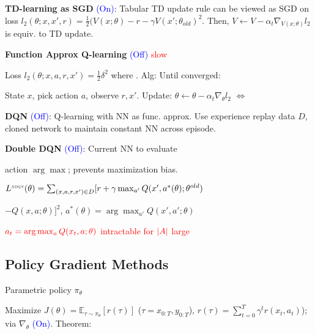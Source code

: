 \vspace*{1mm}
\textbf{TD-learning as SGD} {\fontsize{9}{6}\selectfont \textcolor{blue}{(On)}}: Tabular TD update rule can be viewed as SGD on loss $l_2(\theta; x, x', r) = \frac{1}{2}(V(x;\theta) - r - \gamma V(x'; \theta_{old})^2$. Then, $V \leftarrow V - \alpha_t \nabla_{V(x;\theta)} l_2$ is equiv. to TD update.

\textbf{Function Approx Q-learning} {\fontsize{9}{6}\selectfont \textcolor{blue}{(Off)}} \textcolor{red}{slow}

Loss $l_2(\theta;x,a,r,x') = \frac{1}{2}\delta^2$ where
 . Alg: Until converged:

State $x$, pick action $a$, observe $r,x'$. Update: $\theta \leftarrow \theta - \alpha_t \nabla_\theta l_2$
$\Leftrightarrow$ 

\textbf{DQN} {\fontsize{9}{6}\selectfont \textcolor{blue}{(Off)}}: Q-learning with NN as func. approx. Use experience replay data $D$, cloned network to maintain constant NN across episode.


\textbf{Double DQN} {\fontsize{9}{6}\selectfont \textcolor{blue}{(Off)}}: Current NN to evaluate

action $\arg\max$; prevents maximization bias.

$L^{{\scaleobj{.55}{ DDQN}}} (\theta) = \hspace*{0mm} \sum_{(x,a,r,x') \in D} \hspace*{0mm} [r + \gamma \max_{a'} Q(x', a^*(\theta); \theta^{old})$

$ - Q(x,a;\theta) ]^2$,
$a^*(\theta) = \arg\max_{a'} Q(x', a'; \theta)$

\textcolor{red}{$\textcolor{red}{a_t = \arg\max_a Q(x_t,a;\theta)}$ intractable for $\textcolor{red}{|A|}$ large}


\subsection*{Policy Gradient Methods} Parametric policy $\pi_\theta$

Maximize $J(\theta) = \mathbb{E}_{\tau \sim \pi_\theta} [r(\tau)]$ ($\tau = x_{0:T}, y_{0:T}$), $r(\tau) = \sum_{t=0}^{T} \gamma^t r(x_t, a_t)$); via $\nabla_\theta$ {\fontsize{9}{6}\selectfont \textcolor{blue}{(On)}}. Theorem:

